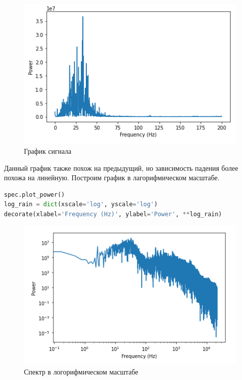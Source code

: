 \begin{figure}[H]
	\begin{center}
		\includegraphics[scale=1]{fig/lab04/lab04_03.png}
		\caption{График сигнала}
	\end{center}
\end{figure}

Данный график также похож на предыдущий, но зависимость падения более похожа на линейную. Построим график в лагорифмическом масштабе.

\begin{lstlisting}[language=Python]
spec.plot_power()
log_rain = dict(xscale='log', yscale='log')
decorate(xlabel='Frequency (Hz)', ylabel='Power', **log_rain)
\end{lstlisting}

\begin{figure}[H]
	\begin{center}
		\includegraphics[scale=1]{fig/lab04/lab04_04.png}
		\caption{Спектр в логорифмическом масштабе}
	\end{center}
\end{figure}


